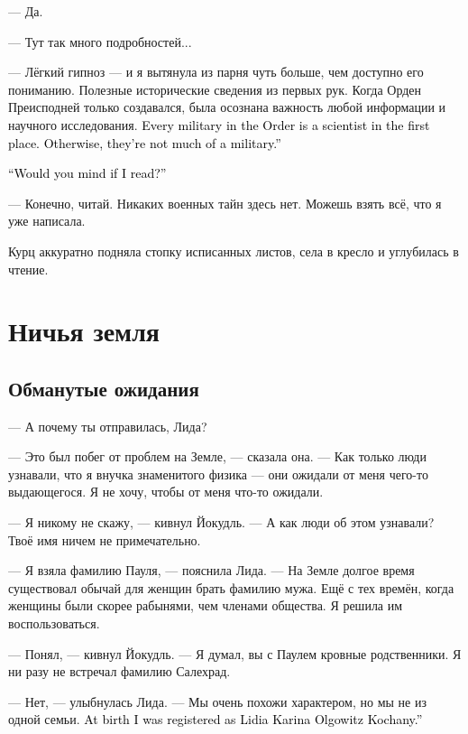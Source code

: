 \documentclass[a4paper,10pt,fleqn]{book}\usepackage{polyglossia}\setdefaultlanguage{english}\setotherlanguage{russian}\defaultfontfeatures{Ligatures=TeX,Mapping=tex-text}\usepackage{xcolor}\definecolor{lightgray}{HTML}{bbbbbb}\color{lightgray}\newcommand{\ml}[3]{\textcolor{black}{#3}}
\begin{document}
--- Да.

--- Тут так много подробностей...

--- Лёгкий гипноз --- и я вытянула из парня чуть больше, чем доступно его пониманию.
Полезные исторические сведения из первых рук.
Когда Орден Преисподней только создавался, была осознана важность любой информации и научного исследования.
\ml{$0$}
{Каждый военный в Ордене --- это в первую очередь учёный.}
{Every military in the Order is a scientist in the first place.}
\ml{$0$}
{Если же нет --- он военный не ахти.}
{Otherwise, they're not much of a military.''}

\ml{$0$}
{--- Ты не против, если я почитаю?}
{``Would you mind if I read?''}

--- Конечно, читай.
Никаких военных тайн здесь нет.
Можешь взять всё, что я уже написала.

Курц аккуратно подняла стопку исписанных листов, села в кресло и углубилась в чтение.

\chapter{Ничья земля}

\section{Обманутые ожидания}

--- А почему ты отправилась, Лида?

--- Это был побег от проблем на Земле, --- сказала она.
--- Как только люди узнавали, что я внучка знаменитого физика --- они ожидали от меня чего-то выдающегося.
Я не хочу, чтобы от меня что-то ожидали.

--- Я никому не скажу, --- кивнул Йокудль.
--- А как люди об этом узнавали?
Твоё имя ничем не примечательно.

--- Я взяла фамилию Пауля, --- пояснила Лида.
--- На Земле долгое время существовал обычай для женщин брать фамилию мужа.
Ещё с тех времён, когда женщины были скорее рабынями, чем членами общества.
Я решила им воспользоваться.

--- Понял, --- кивнул Йокудль.
--- Я думал, вы с Паулем кровные родственники.
Я ни разу не встречал фамилию Салехрад. %

--- Нет, --- улыбнулась Лида.
--- Мы очень похожи характером, но мы не из одной семьи.
\ml{$0$}
{При рождении я была записана как Лидия Карина Ольговиц Коханый.}
{At birth I was registered as Lidia Karina Olgowitz Kochany.''}
\end{document}
